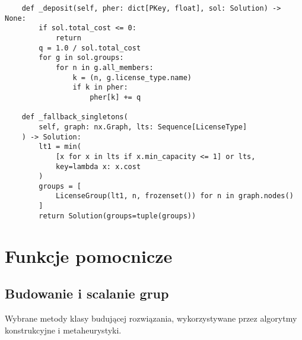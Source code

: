 {\begin{verbatim}
    def _deposit(self, pher: dict[PKey, float], sol: Solution) -> None:
        if sol.total_cost <= 0:
            return
        q = 1.0 / sol.total_cost
        for g in sol.groups:
            for n in g.all_members:
                k = (n, g.license_type.name)
                if k in pher:
                    pher[k] += q

    def _fallback_singletons(
        self, graph: nx.Graph, lts: Sequence[LicenseType]
    ) -> Solution:
        lt1 = min(
            [x for x in lts if x.min_capacity <= 1] or lts,
            key=lambda x: x.cost
        )
        groups = [
            LicenseGroup(lt1, n, frozenset()) for n in graph.nodes()
        ]
        return Solution(groups=tuple(groups))
\end{verbatim}
}

\section{Funkcje pomocnicze}
\subsection{Budowanie i scalanie grup}
Wybrane metody klasy budującej rozwiązania, wykorzystywane przez
algorytmy konstrukcyjne i metaheurystyki.

